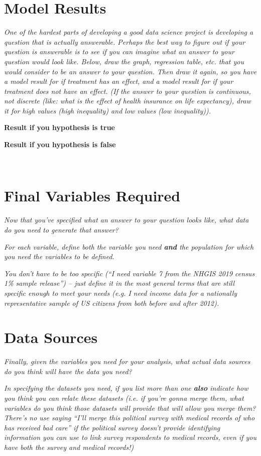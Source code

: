 \documentclass[12pt]{article}
\begin{document}
\section{Model Results}
\emph{One of the hardest parts of developing a good data science project is developing a question that is actually answerable. Perhaps the best way to figure out if your question is answerable is to see if you can imagine what an answer to your question would look like. Below, draw the graph, regression table, etc. that you would consider to be an answer to your question. Then draw it again, so you have a model result for if treatment has an effect, and a model result for if  your treatment does not have an effect. (If the answer to your question is continuous, not discrete (like: what is the effect of health insurance on life expectancy), draw it for high values (high inequality) and low values (low inequality)).}

\begin{minipage}{0.5\textwidth}
\centering
\textbf{Result if you hypothesis is true}
\end{minipage}
\begin{minipage}{0.5\textwidth}
\centering
\textbf{Result if you hypothesis is false}
\end{minipage}
\vspace*{5cm}\\

\section{Final Variables Required}

\emph{Now that you've specified what an answer to your question looks like, what data do you need to generate that answer?}

\emph{For each variable, define both the variable you need \textbf{and} the population for which you need the variables to be defined.}

\emph{You don't have to be too specific (``I need variable 7 from the NHGIS 2019 census 1\% sample release'') -- just define it in the most general terms that are still specific enough to meet your needs (e.g. I need income data for a nationally representative sample of US citizens from both before and after 2012). }

\section{Data Sources}\label{section_datasources}

\emph{Finally, given the variables you need for your analysis, what actual data sources do you think will have the data you need?}

\emph{In specifying the datasets you need, if you list more than one \textbf{also} indicate how you think you can relate these datasets (i.e. if you're gonna merge them, what variables do you think those datasets will provide that will allow you merge them? There's no use saying ``I'll merge this political survey with medical records of who has received bad care'' if the political survey doesn't provide identifying information you can use to link survey respondents to medical records, even if you have both the survey and medical records!)}
\end{document}
